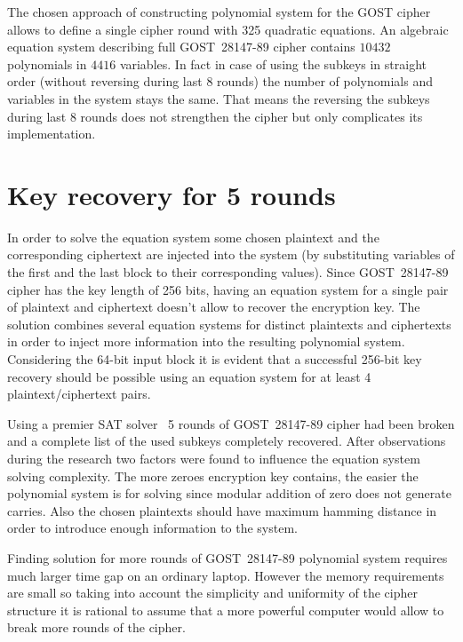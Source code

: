 The chosen approach of constructing polynomial system for the GOST cipher
allows to define a single cipher round with 325 quadratic equations. An
algebraic equation system describing full GOST~28147-89 cipher contains $10432$
polynomials in $4416$ variables. In fact in case of using the subkeys in straight
order (without reversing during last 8 rounds) the number of polynomials and
variables in the system stays the same. That means the reversing the subkeys
during last 8 rounds does not strengthen the cipher but only complicates its
implementation. 

\section{Key recovery for 5 rounds}
\label{sec:key-rec}

In order to solve the equation system some chosen plaintext and the
corresponding ciphertext are injected into the system (by substituting
variables of the first and the last block to their corresponding values).
Since GOST~28147-89 cipher has the key length of 256 bits, having an equation
system for a single pair of plaintext and ciphertext doesn't allow to recover
the encryption key. The solution combines several equation systems for
distinct plaintexts and ciphertexts in order to inject more information into
the resulting polynomial system. Considering the 64-bit input block it is
evident that a successful 256-bit key recovery should be possible using an
equation system for at least 4 plaintext/ciphertext pairs.

Using a premier SAT solver~\cite{soos:cryptominisat} 5 rounds of GOST~28147-89
cipher had been broken and a complete list of the used subkeys completely recovered. After
observations during the research two factors were found to influence the
equation system solving complexity. The more zeroes encryption key contains,
the easier the polynomial system is for solving since modular addition of zero
does not generate carries. Also the chosen plaintexts should have maximum
hamming distance in order to introduce enough information to the system.

Finding solution for more rounds of GOST~28147-89 polynomial system requires
much larger time gap on an ordinary laptop. However the memory requirements are
small so taking into account the simplicity and uniformity of the cipher
structure it is rational to assume that a more powerful computer would allow to
break more rounds of the cipher.
